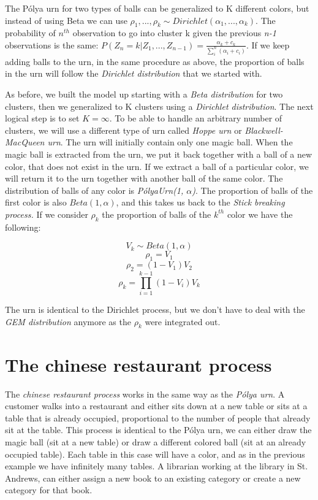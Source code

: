 \documentclass[12pt,a4paper]{article}
\begin{document}
The Pólya urn for two types of balls can be generalized to K different colors, but instead of using Beta we can use $\rho_{1}, ..., \rho_{k} \sim Dirichlet(\alpha_{1}, ..., \alpha_{k})$. The probability of $n^{th}$ observation to go into cluster k given the previous \textit{n-1} observations is the same:
$P(Z_{n} = k|Z_{1}, ..., Z_{n-1}) = \frac{\alpha_{k} + c_{k}}{\sum_i^n (\alpha_{i} + c_{i})}$. If we keep adding balls to the urn, in the same procedure as above, the proportion of balls in the urn will follow the \textit{Dirichlet distribution} that we started with. 

As before, we built the model up starting with a \textit{Beta distribution} for two clusters, then we generalized to K clusters using a \textit{Dirichlet distribution}. The next logical step is to set $K=\infty$. To be able to handle an arbitrary number of clusters, we will use a different type of urn called \textit{Hoppe urn} or \textit{Blackwell-MacQueen urn}. The urn will initially contain only one magic ball. When the magic ball is extracted from the urn, we put it back together with a ball of a new color, that does not exist in the urn. If we extract a ball of a particular color, we will return it to the urn together with another ball of the same color. The distribution of balls of any color is \textit{PólyaUrn(1, $\alpha$)}. The proportion of balls of the first color is also $Beta(1, \alpha)$, and this takes us back to the \textit{Stick breaking process.} If we consider $\rho_{k}$ the proportion of balls of the $k^{th}$ color we have the following: 

$$ V_{k} \sim Beta(1, \alpha) $$
$$\rho_{1} = V_{1}$$
$$\rho_{2} = (1 - V_{1})V_{2}$$
$$\rho_{k} = \prod_{i=1}^{k-1}(1-V_{i})V_{k}$$

The urn is identical to the Dirichlet process, but we don't have to deal with the \textit{GEM distribution} anymore as the $\rho_{k}$ were integrated out.

\section{The chinese restaurant process}
The \textit{chinese restaurant process} works in the same way as the \textit{Pólya urn}. A customer walks into a restaurant and either sits down at a new table or sits at a table that is already occupied, proportional to the number of people that already sit at the table. This process is identical to the Pólya urn, we can either draw the magic ball (sit at a new table) or draw a different colored ball (sit at an already occupied table). Each table in this case will have a color, and as in the previous example we have infinitely many tables. A librarian working at the library in St. Andrews, can either assign a new book to an existing category or create a new category for that book. 
\end{document}
